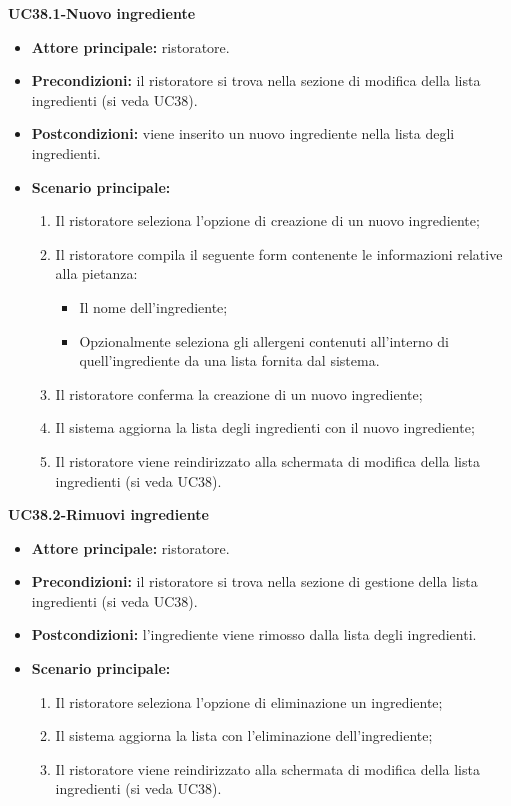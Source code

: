 \textbf{UC38.1-Nuovo ingrediente}  
\begin{itemize}
    \item \textbf{Attore principale:} ristoratore.
    \item \textbf{Precondizioni:} il ristoratore si trova nella sezione di modifica della lista ingredienti (si veda UC38).
    \item \textbf{Postcondizioni:} viene inserito un nuovo ingrediente nella lista degli ingredienti.
    \item \textbf{Scenario principale:}
    \begin{enumerate}
        \item Il ristoratore seleziona l'opzione di creazione di un nuovo ingrediente;
        \item Il ristoratore compila il seguente form contenente le informazioni relative alla pietanza:
        \begin{itemize}
            \item Il nome dell'ingrediente;
            \item Opzionalmente seleziona gli allergeni contenuti all'interno di quell'ingrediente da una lista fornita dal sistema.
        \end{itemize}
        \item Il ristoratore conferma la creazione di un nuovo ingrediente;
        \item Il sistema aggiorna la lista degli ingredienti con il nuovo ingrediente;
        \item Il ristoratore viene reindirizzato alla schermata di modifica della lista ingredienti (si veda UC38).
    \end{enumerate}
\end{itemize}


\textbf{UC38.2-Rimuovi ingrediente}  
\begin{itemize}
    \item \textbf{Attore principale:} ristoratore.
    \item \textbf{Precondizioni:} il ristoratore si trova nella sezione di gestione della lista ingredienti (si veda UC38).
    \item \textbf{Postcondizioni:} l'ingrediente viene rimosso dalla lista degli ingredienti.
    \item \textbf{Scenario principale:}
    \begin{enumerate}
        \item Il ristoratore seleziona l'opzione di eliminazione un ingrediente;
        \item Il sistema aggiorna la lista con l'eliminazione dell'ingrediente;
        \item Il ristoratore viene reindirizzato alla schermata di modifica della lista ingredienti (si veda UC38).
    \end{enumerate}
\end{itemize}


